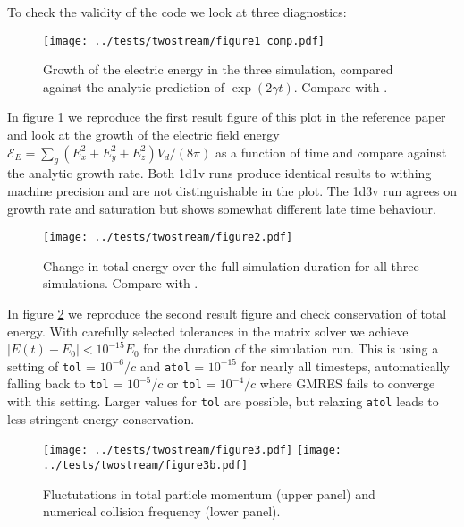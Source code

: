 \documentclass[%
preprint,
amsmath,amssymb,
aps,
]{revtex4-2}
\begin{document}
To check the validity of the code we look at three diagnostics:

\begin{figure}
    \centering
    \texttt{[image: ../tests/twostream/figure1\_comp.pdf]}
    \caption{Growth of the electric energy in the three simulation, compared
    against the analytic prediction of $\exp\left(2\gamma t\right)$. Compare
    with \cite[Figure 1]{LAPENTA2017349}.}
    \label{fig:twostream_fig1}
\end{figure}

In figure \ref{fig:twostream_fig1} we reproduce the first result figure of this
plot in the reference paper and look at the growth of the electric field energy
$\mathcal{E}_E = \sum_g (E_x^2 + E_y^2 + E_z^2) V_d / (8 \pi)$ as a function of
time and compare against the analytic growth rate. Both 1d1v runs produce
identical results to withing machine precision and are not distinguishable in
the plot. The 1d3v run agrees on growth rate and saturation but shows somewhat
different late time behaviour.

\begin{figure}
    \centering
    \texttt{[image: ../tests/twostream/figure2.pdf]}
    \caption{Change in total energy over the full simulation duration for all
    three simulations. Compare with \cite[Figure 2]{LAPENTA2017349}.}
    \label{fig:twostream_fig2}
\end{figure}

In figure \ref{fig:twostream_fig2} we reproduce the second result figure and
check conservation of total energy. With carefully selected tolerances in the
matrix solver we achieve $\left|E(t) - E_0\right| < 10^{-15} E_0$ for the
duration of the simulation run. This is using a setting of \texttt{tol} =
$10^{-6}/c$ and \texttt{atol} = $10^{-15}$ for nearly all timesteps,
automatically falling back to \texttt{tol} = $10^{-5}/c$ or \texttt{tol} =
$10^{-4}/c$ where GMRES fails to converge with this setting. Larger values for
\texttt{tol} are possible, but relaxing \texttt{atol} leads to less stringent
energy conservation.

\begin{figure}
    \centering
    \texttt{[image: ../tests/twostream/figure3.pdf]}
    \texttt{[image: ../tests/twostream/figure3b.pdf]}
    \caption{Fluctutations in total particle momentum (upper panel) and
    numerical collision frequency (lower panel).}
    \label{fig:twostream_fig3}
\end{figure}
\end{document}
